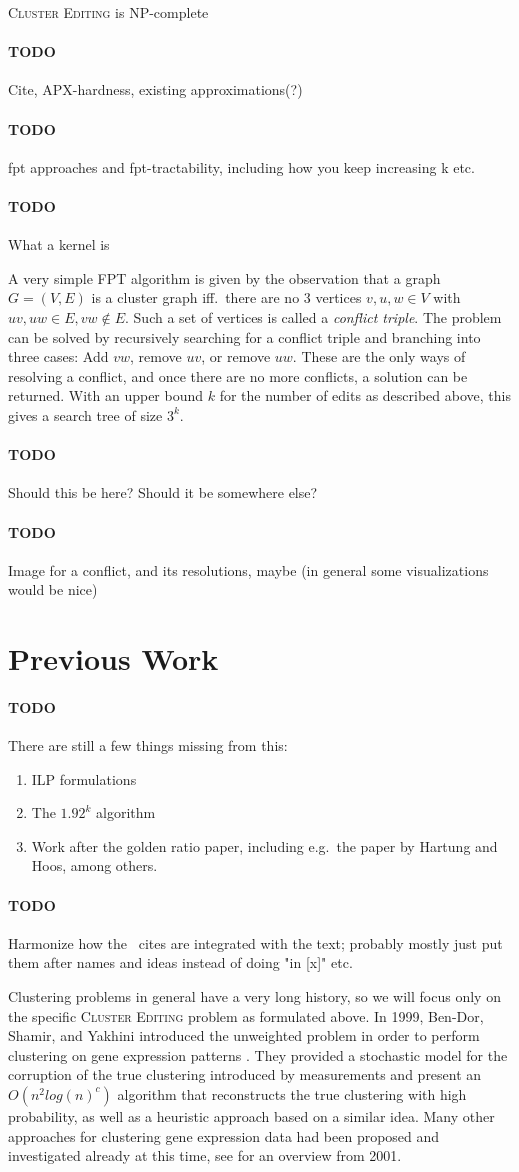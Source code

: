 \documentclass{article}
\newcommand{\todo}[1]{\paragraph{TODO} #1}
\theoremstyle{definition}
\begin{document}
\textsc{Cluster Editing} is NP-complete
\todo Cite, APX-hardness, existing approximations(?)

\todo fpt approaches and fpt-tractability, including how you keep increasing k etc.
\todo What a kernel is

A very simple FPT algorithm is given by the observation that a graph $G = (V, E)$ is a cluster graph
iff.\ there are no 3 vertices $v, u, w \in V$ with $uv, uw \in E, vw \notin E$. Such a set of
vertices is called a \emph{conflict triple}. The problem can be solved by recursively searching for
a conflict triple and branching into three cases: Add $vw$, remove $uv$, or remove $uw$. These are
the only ways of resolving a conflict, and once there are no more conflicts, a solution can be
returned. With an upper bound $k$ for the number of edits as described above, this gives a search
tree of size $3^k$.

\todo Should this be here? Should it be somewhere else?

\todo Image for a conflict, and its resolutions, maybe (in general some visualizations would be
nice)


\section{Previous Work}

\todo There are still a few things missing from this: \begin{enumerate}
	\item ILP formulations
	\item The $1.92^k$ algorithm
	\item Work after the golden ratio paper, including e.g.\ the paper by Hartung and Hoos, among
		others.
\end{enumerate}

\todo Harmonize how the \ cites are integrated with the text; probably mostly just put them after
names and ideas instead of doing "in [x]" etc.

Clustering problems in general have a very long history, so we will focus only on the specific
\textsc{Cluster Editing} problem as formulated above. In 1999, Ben-Dor, Shamir, and Yakhini
introduced the unweighted problem in order to perform clustering on gene expression patterns
\cite{BenDor}. They provided a stochastic model for the corruption of the true clustering introduced
by measurements and present an $O(n^2 log(n)^c)$ algorithm that reconstructs the true clustering
with high probability, as well as a heuristic approach based on a similar idea. Many other
approaches for clustering gene expression data had been proposed and investigated already at this
time, see \cite{ShamirOverview} for an overview from 2001.
\end{document}
